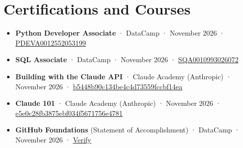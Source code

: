 \section{Certifications and Courses}

{\footnotesize
\begin{itemize}
  \item \textbf{Python Developer Associate} · DataCamp · November 2026 · \href{https://www.datacamp.com/certificate/PDEVA0012552053199}{PDEVA0012552053199}
  \item \textbf{SQL Associate} · DataCamp · November 2026 · \href{https://www.datacamp.com/certificate/SQA0010993026072}{SQA0010993026072}
  \item \textbf{Building with the Claude API} · Claude Academy (Anthropic) · November 2026 · \href{https://academy.claude.com/verify/b5448b90c134be4c4d73559fccbf14ea}{b5448b90c134be4c4d73559fccbf14ea}
  \item \textbf{Claude 101} · Claude Academy (Anthropic) · November 2026 · \href{https://academy.claude.com/verify/e5e0c28fb3875ebf034f5671756e4781}{e5e0c28fb3875ebf034f5671756e4781}
  \item \textbf{GitHub Foundations} (Statement of Accomplishment) · DataCamp · November 2026 · \href{https://www.datacamp.com/completed/statement-of-accomplishment/track/3aca4f111e237751ba02d75b12f75649670f1fbe}{Verify}
\end{itemize}
}
